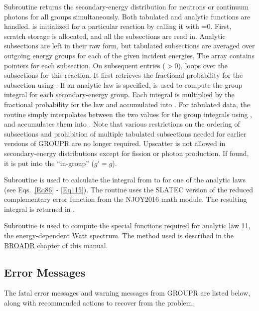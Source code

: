 Subroutine 
returns the secondary-energy distribution for
neutrons or continuum photons for all groups simultaneously.  Both
tabulated and analytic functions are handled.   is
initialized for a particular reaction by calling it with =0.
First, scratch storage is allocated, and all the  subsections are read in.
Analytic subsections are left in their raw form, but tabulated subsections
are averaged over outgoing energy groups for each of the given incident
energies.  The array  contains pointers for each subsection.
On subsequent entries ($>$0),  loops over the
subsections for this reaction.  It first retrieves the fractional
probability for the subsection using .
If an analytic law is specified, 
is used to compute the group integral for each secondary-energy
group.  Each integral is multiplied by the fractional probability
for the law and accumulated into .  For tabulated data,
the routine simply interpolates between the two values for the
group integrals using , and accumulates them
into .  Note that various restrictions on the ordering of
subsections and prohibition of multiple tabulated subsections needed
for earlier versions of GROUPR are no longer required.  Upscatter
is not allowed in secondary-energy distributions except for fission
or photon production.  If found, it is put into the ``in-group''
($g'{=}g$).

Subroutine 
is used to calculate the integral from
 to  for one of the analytic laws (see
Eqs.~\ref{Eq86} - \ref{Eq115}).  The routine uses the SLATEC version
of the reduced complementary error function from the NJOY2016
math module.  The resulting integral is returned
in .

Subroutine  is used to compute
the special functions required for analytic law 11, the energy-dependent
Watt spectrum.  The method used is described in the
\hyperlink{sBROADRhy}{BROADR}
chapter of this manual.


\subsection{Error Messages}
\label{ssGROUPR_msg}

The fatal error messages and warning messages from GROUPR
are listed below, along with recommended actions to recover
from the problem.

